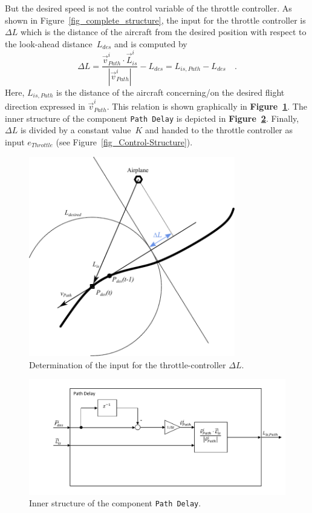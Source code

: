 \documentclass[11pt,a4paper]{scrartcl}		%
\begin{document}
But the desired speed is not the control variable of the throttle controller. As shown in Figure~\ref{fig_complete_structure}, the input for the throttle controller is $\Delta L$ which is the distance of the aircraft from the desired position with respect to the look-ahead distance~$L_{des}$ and is computed by
\begin{equation}
\Delta L = \frac{\vec{v}_{Path}^i \cdot \vec{L}_{is}^i}{|\vec{v}_{Path}^i|}-L_{des} = L_{is,Path}-L_{des} \quad .
\end{equation}
Here, $L_{is,Path}$ is the distance of the aircraft concerning/on the desired flight direction expressed in $\vec{v}_{Path}^i$.
This relation is shown graphically in \textbf{Figure~\ref{fig_explanation-diagram-throttle}}. The inner structure of the component \texttt{Path Delay} is depicted in \textbf{Figure~\ref{fig_Path_Delay}}.
Finally, $\Delta L$ is divided by a constant value~$K$ and handed to the throttle controller as input $e_{Throttle}$ (see Figure~\ref{fig_Control-Structure}).

\begin{figure}[bth]
  \begin{center}
  	\includegraphics[width=9cm]{pictures/explanation-diagram-throttle.pdf}
  \end{center}
  \caption{Determination of the input for the throttle-controller $\Delta L$.}
  \label{fig_explanation-diagram-throttle}
\end{figure}

\begin{figure}[tbh]
  \begin{center}
  	\includegraphics[width=14cm]{pictures/Path_Delay.pdf}
  \end{center}
  \caption{Inner structure of the component \texttt{Path Delay}.}
  \label{fig_Path_Delay}
\end{figure} 
\end{document}
